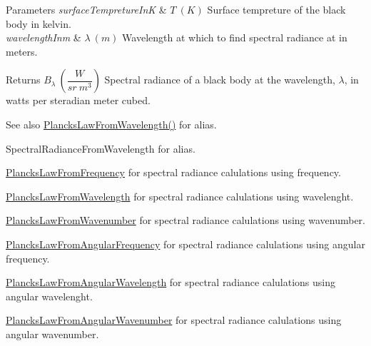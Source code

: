 \begin{DoxyParams}{Parameters}
{\em surface\+Tempreture\+InK} & $T\ (K)$ Surface tempreture of the black body in kelvin. \\
\hline
{\em wavelength\+Inm} & $\lambda\ (m)$ Wavelength at which to find spectral radiance at in meters. \\
\hline
\end{DoxyParams}
\begin{DoxyReturn}{Returns}
$B_{\lambda}\ ( \dfrac{W}{sr\ m^3})$ Spectral radiance of a black body at the wavelength, $\lambda$, in watts per steradian meter cubed. 
\end{DoxyReturn}
\begin{DoxySeeAlso}{See also}
\mbox{\hyperlink{group___e_g_x_phys-_electrodynamics-_black_body-_plancks_law_ga54639bc031ded51ef78aa82b0457a4dd}{Plancks\+Law\+From\+Wavelength()}} for alias. 

Spectral\+Radiance\+From\+Wavelength for alias. 

\mbox{\hyperlink{group___e_g_x_phys-_electrodynamics-_black_body-_plancks_law_ga68aae82f8a086831358c4a61c8c80ba4}{Plancks\+Law\+From\+Frequency}} for spectral radiance calulations using frequency. 

\mbox{\hyperlink{group___e_g_x_phys-_electrodynamics-_black_body-_plancks_law_ga54639bc031ded51ef78aa82b0457a4dd}{Plancks\+Law\+From\+Wavelength}} for spectral radiance calulations using wavelenght. 

\mbox{\hyperlink{group___e_g_x_phys-_electrodynamics-_black_body-_plancks_law_ga6648ae2a0fbff6735c1e1a04c7cac746}{Plancks\+Law\+From\+Wavenumber}} for spectral radiance calulations using wavenumber. 

\mbox{\hyperlink{group___e_g_x_phys-_electrodynamics-_black_body-_plancks_law_gaac540560c71e30c02b91d22e417b5863}{Plancks\+Law\+From\+Angular\+Frequency}} for spectral radiance calulations using angular frequency. 

\mbox{\hyperlink{group___e_g_x_phys-_electrodynamics-_black_body-_plancks_law_ga7322124727f968d28807e918c5eeb23f}{Plancks\+Law\+From\+Angular\+Wavelength}} for spectral radiance calulations using angular wavelenght. 

\mbox{\hyperlink{group___e_g_x_phys-_electrodynamics-_black_body-_plancks_law_gaa3d3e0fdb77d25bdd40523f9975de902}{Plancks\+Law\+From\+Angular\+Wavenumber}} for spectral radiance calulations using angular wavenumber. 
\end{DoxySeeAlso}
\mbox{\label{group___e_g_x_phys-_electrodynamics-_black_body-_plancks_law_gaac540560c71e30c02b91d22e417b5863}} 
